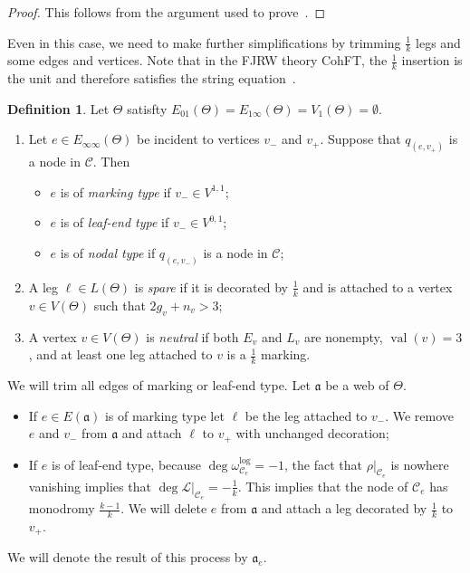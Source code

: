 \documentclass{amsart}
\theoremstyle{definition}
\newtheorem{defn}[thm]{Definition}
\theoremstyle{remark}
\theoremstyle{plain}
\theoremstyle{definition}
\theoremstyle{remark}
\newcommand{\mc}[1]{\mathcal{#1}}
\newcommand{\mf}[1]{\mathfrak{#1}}
\newcommand{\on}[1]{\operatorname{#1}}
\newcommand{\1}{\mathbf{1}}
\newcommand{\2}{\mathbf{2}}
\newcommand{\3}{\mathbf{3}}
\begin{document}
\begin{proof}
    This follows from the argument used to prove~\cite[Lemma 3.11]{msp2}.
\end{proof}

Even in this case, we need to make further simplifications by trimming $\frac{1}{k}$ legs and some edges and vertices. Note that in the FJRW theory CohFT, the $\frac{1}{k}$ insertion is the unit and therefore satisfies the string equation~\cite[Theorem 5.1.2]{mfcohftFJRW}.

\begin{defn}
    Let $\Theta$ satisfty $E_{01}(\Theta) = E_{1\infty}(\Theta) = V_1(\Theta) = \emptyset$.
    \begin{enumerate}
        \item Let $e \in E_{\infty\infty}(\Theta)$ be incident to vertices $v_-$ and $v_+$. Suppose that $q_{(e,v_+)}$ is a node in $\mc{C}$. Then 
            \begin{itemize}
                \item $e$ is of \textit{marking type} if $v_- \in V^{1,1}$;
                \item $e$ is of \textit{leaf-end type} if $v_- \in V^{0,1}$;
                \item $e$ is of \textit{nodal type} if $q_{(e,v_-)}$ is a node in $\mc{C}$;
            \end{itemize}
        \item A leg $\ell \in L(\Theta)$ is \textit{spare} if it is decorated by $\frac{1}{k}$ and is attached to a vertex $v \in V(\Theta)$ such that $2g_v + n_v > 3$;
        \item A vertex $v \in V(\Theta)$ is \textit{neutral} if both $E_v$ and $L_v$ are nonempty, $\on{val}(v) = 3$, and at least one leg attached to $v$ is a $\frac{1}{k}$ marking.
    \end{enumerate}
\end{defn}

We will trim all edges of marking or leaf-end type. Let $\mf{a}$ be a web of $\Theta$. 
\begin{itemize}
    \item If $e \in E(\mf{a})$ is of marking type let $\ell$ be the leg attached to $v_-$. We remove $e$ and $v_-$ from $\mf{a}$ and attach $\ell$ to $v_+$ with unchanged decoration;
    \item If $e$ is of leaf-end type, because $\deg \omega_{\mc{C}_e}^{\log} = -1$, the fact that $\rho|_{\mc{C}_e}$ is nowhere vanishing implies that $\deg \mc{L}|_{\mc{C}_e} = -\frac{1}{k}$. This implies that the node of $\mc{C}_e$ has monodromy $\frac{k-1}{k}$. We will delete $e$ from $\mf{a}$ and attach a leg decorated by $\frac{1}{k}$ to $v_+$.
\end{itemize}
We will denote the result of this process by $\mf{a}_e$.
\end{document}
